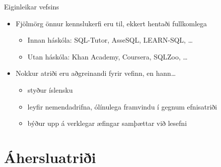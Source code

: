 \documentclass{beamer}
\begin{document}
\begin{frame}{Eiginleikar vefsins}
    \begin{itemize}
        \item Fjölmörg önnur kennslukerfi eru til, ekkert hentaði fullkomlega
        \begin{itemize}
            \item Innan háskóla: SQL-Tutor, AsseSQL, LEARN-SQL, \ldots
            \item Utan háskóla: Khan Academy, Coursera, SQLZoo, \ldots
        \end{itemize}
        \item Nokkur atriði eru aðgreinandi fyrir vefinn, en hann\ldots
        \begin{itemize}
            \item styður íslensku
            \item leyfir nemendadrifna, ólínulega framvindu í gegnum efnisatriði
            \item býður upp á verklegar æfingar samþættar við lesefni
        \end{itemize}
    \end{itemize}
\end{frame}

\section{Áhersluatriði}
\end{document}
